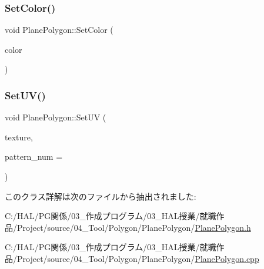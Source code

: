 \subsubsection{\texorpdfstring{Set\+Color()}{SetColor()}}
{\footnotesize\ttfamily void Plane\+Polygon\+::\+Set\+Color (\begin{DoxyParamCaption}\item[{\mbox{\hyperlink{_vector3_d_8h_a680c30c4a07d86fe763c7e01169cd6cc}{X\+Color4}}}]{color }\end{DoxyParamCaption})}

\mbox{\label{class_plane_polygon_a081458fcb9e758dd8be5b027c66a92ad}} 
\subsubsection{\texorpdfstring{Set\+U\+V()}{SetUV()}}
{\footnotesize\ttfamily void Plane\+Polygon\+::\+Set\+UV (\begin{DoxyParamCaption}\item[{const \mbox{\hyperlink{class_texture_object}{Texture\+Object}} $\ast$}]{texture,  }\item[{const int}]{pattern\+\_\+num = {} }\end{DoxyParamCaption})}



このクラス詳解は次のファイルから抽出されました\+:\begin{DoxyCompactItemize}
\item 
C\+:/\+H\+A\+L/\+P\+G関係/03\+\_\+作成プログラム/03\+\_\+\+H\+A\+L授業/就職作品/\+Project/source/04\+\_\+\+Tool/\+Polygon/\+Plane\+Polygon/\mbox{\hyperlink{_plane_polygon_8h}{Plane\+Polygon.\+h}}\item 
C\+:/\+H\+A\+L/\+P\+G関係/03\+\_\+作成プログラム/03\+\_\+\+H\+A\+L授業/就職作品/\+Project/source/04\+\_\+\+Tool/\+Polygon/\+Plane\+Polygon/\mbox{\hyperlink{_plane_polygon_8cpp}{Plane\+Polygon.\+cpp}}\end{DoxyCompactItemize}
